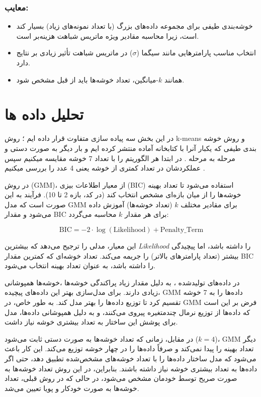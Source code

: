 \documentclass[a4paper,12pt,openany]{report}
\begin{document}
\subsection*{معایب:}
\begin{itemize}
	\item خوشه‌بندی طیفی برای مجموعه داده‌های بزرگ (با تعداد نمونه‌های زیاد) بسیار کند است، زیرا محاسبه مقادیر ویژه ماتریس شباهت هزینه‌بر است.
	\item  انتخاب مناسب پارامترهایی مانند سیگما (\( \sigma \)) در ماتریس شباهت تأثیر زیادی بر نتایج دارد.
	\item  همانند \( k \)-میانگین، تعداد خوشه‌ها باید از قبل مشخص شود.
\end{itemize}

\chapter{تحلیل داده ها}
در این بخش سه پیاده سازی متفاوت قرار داده ایم ؛ روش k-means و روش  خوشه بندی طیفی که یکبار آنرا با کتابخانه آماده منتشر کرده ایم و بار دیگر به صورت دستی و مرحله به مرحله . در ابتدا هر الگوریتم را با تعداد 7 خوشه مقایسه میکنیم سپس عملکردشان در تعداد کمتری از خوشه یعنی 4 عدد را بررسی میکنیم .

در روش  (GMM)، از معیار اطلاعات بیزی (BIC) استفاده می‌شود تا تعداد بهینه خوشه‌ها را از میان بازه‌ای مشخص انتخاب کند (در کد، بازه 2 تا 10). فرآیند به این صورت است که مدل GMM برای مقادیر مختلف \( k \) (تعداد خوشه‌ها) آموزش داده می‌شود و مقدار BIC برای هر مقدار \( k \) محاسبه می‌گردد:

\[
\text{BIC} = -2 \cdot \log(\text{Likelihood}) + \text{Penalty\_Term}
\]

این معیار، مدلی را ترجیح می‌دهد که بیشترین \textit{Likelihood} را داشته باشد، اما پیچیدگی بیشتر (تعداد پارامترهای بالاتر) را جریمه می‌کند. تعداد خوشه‌ای که کمترین مقدار BIC را داشته باشد، به عنوان تعداد بهینه انتخاب می‌شود.

در داده‌های تولید‌شده ، به دلیل مقدار زیاد پراکندگی خوشه‌ها ،خوشه‌ها همپوشانی زیادی دارند. برای مدل‌سازی بهتر این داده‌های پیچیده، GMM داده‌ها را به 7 خوشه تقسیم کرد تا توزیع داده‌ها را بهتر مدل کند. به طور خاص، در GMM فرض بر این است که داده‌ها از توزیع نرمال چندمتغیره پیروی می‌کنند، و به دلیل همپوشانی داده‌ها، مدل برای پوشش این ساختار به تعداد بیشتری خوشه نیاز داشت.

در مقابل، زمانی که تعداد خوشه‌ها به صورت دستی ثابت می‌شود (\( k =4 \))، GMM دیگر تعداد بهینه را پیدا نمی‌کند و صرفاً داده‌ها را در چهار خوشه توزیع می‌کند. این کار باعث می‌شود که مدل ساختار داده‌ها را با تعداد خوشه‌های مشخص‌شده تطبیق دهد، حتی اگر داده‌ها به تعداد بیشتری خوشه نیاز داشته باشند. بنابراین، در این روش تعداد خوشه‌ها به صورت صریح توسط خودمان مشخص می‌شود، در حالی که در روش قبلی، تعداد خوشه‌ها به صورت خودکار و پویا تعیین می‌شد.
\end{document}

